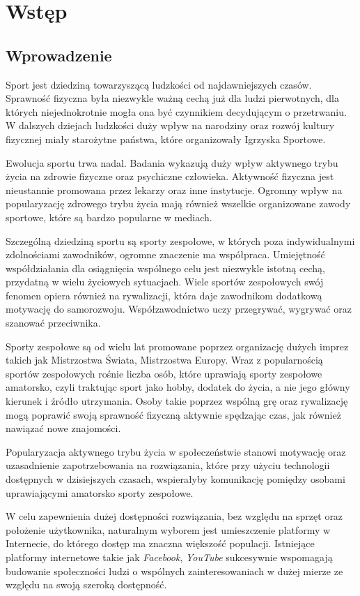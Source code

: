 \chapter{Wstęp}
\section{Wprowadzenie}


Sport jest dziedziną towarzyszącą ludzkości od najdawniejszych czasów. Sprawność fizyczna była niezwykle ważną cechą już dla ludzi pierwotnych, dla których niejednokrotnie mogła ona być czynnikiem decydującym o przetrwaniu. W dalszych dziejach ludzkości duży wpływ na narodziny oraz rozwój kultury fizycznej miały starożytne państwa, które organizowały Igrzyska Sportowe.

Ewolucja sportu trwa nadal. Badania wykazują duży wpływ aktywnego trybu życia na zdrowie fizyczne oraz psychiczne człowieka. Aktywność fizyczna jest nieustannie promowana przez lekarzy oraz inne instytucje. Ogromny wpływ na popularyzację zdrowego trybu życia mają również wszelkie organizowane zawody sportowe, które są bardzo popularne w mediach.

Szczególną dziedziną sportu są sporty zespołowe, w których poza indywidualnymi zdolnościami zawodników, ogromne znaczenie ma współpraca. Umiejętność współdziałania dla osiągnięcia wspólnego celu jest niezwykle istotną cechą, przydatną w wielu życiowych sytuacjach. Wiele sportów zespołowych swój fenomen opiera również na rywalizacji, która daje zawodnikom dodatkową motywację do samorozwoju. Współzawodnictwo uczy przegrywać, wygrywać oraz szanować przeciwnika. 

Sporty zespołowe są od wielu lat promowane poprzez organizację dużych imprez takich jak Mistrzostwa Świata, Mistrzostwa Europy. Wraz z popularnością sportów zespołowych rośnie liczba osób, które uprawiają sporty zespołowe amatorsko, czyli traktując sport jako hobby, dodatek do życia, a nie jego główny kierunek i źródło utrzymania. Osoby takie poprzez wspólną grę oraz rywalizację mogą poprawić swoją sprawność fizyczną aktywnie spędzając czas, jak również nawiązać nowe znajomości. 

Popularyzacja aktywnego trybu życia w społeczeństwie stanowi motywację oraz uzasadnienie zapotrzebowania na rozwiązania, które przy użyciu technologii dostępnych w dzisiejszych czasach, wspierałyby komunikację pomiędzy osobami uprawiającymi amatorsko sporty zespołowe. 

W celu zapewnienia dużej dostępności rozwiązania, bez względu na sprzęt oraz położenie użytkownika, naturalnym wyborem jest umieszczenie platformy w Internecie, do którego dostęp ma znaczna większość populacji. Istniejące platformy internetowe takie jak \textit{Facebook}, \textit{YouTube} sukcesywnie wspomagają budowanie społeczności ludzi o wspólnych zainteresowaniach w dużej mierze ze względu na swoją szeroką dostępność.

